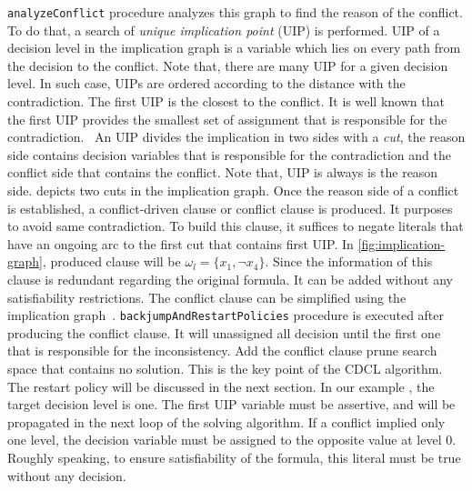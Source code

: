 \texttt{analyzeConflict} procedure analyzes this graph to find the reason of the conflict. To do that, a search of
\emph{unique implication point} (UIP) is performed. UIP of a decision level in the implication graph is a variable
which lies on every path from the decision to the conflict. Note that, there are many UIP for a given decision level.
In such case, UIPs are ordered according to the distance with the contradiction. The first UIP is the closest to
the conflict. It is well known that the first UIP provides the smallest set of assignment that is responsible for the
contradiction.~\cite{zhang2001efficient}
An UIP divides the implication in two sides with a \emph{cut}, the reason side contains decision variables 
that is responsible for the contradiction and the conflict side that contains the conflict. Note that, UIP is always is the 
reason side.  depicts two cuts in the implication graph.
Once the reason side of a conflict is established, a conflict-driven clause or conflict clause is produced.
It purposes to avoid same contradiction. To build this clause, it suffices to negate 
literals that have an ongoing arc to the first cut that contains first UIP. In \cref{fig:implication-graph}, produced
clause will be $\omega_l = \{x_1, \neg x_4 \}$. Since the information of this clause is redundant regarding 
the original formula. It can be added without any satisfiability restrictions. The conflict clause can be simplified
using the implication graph~\cite{sorensson2009minimizing}.
\texttt{backjumpAndRestartPolicies} procedure is executed after producing the conflict clause.
It will unassigned all
decision until the first one that is responsible for the inconsistency. Add the conflict clause prune search space that 
contains no solution. This is the key point of the CDCL algorithm. The restart policy will be discussed in the next section.
In our example , the target decision level is one. The first UIP variable must be assertive,
and will be propagated in the next loop of the solving algorithm.
If a conflict implied only one level, the decision variable must be assigned to the opposite value at level 0.
Roughly speaking, to ensure satisfiability of the formula, this literal must be true without any decision.
 
